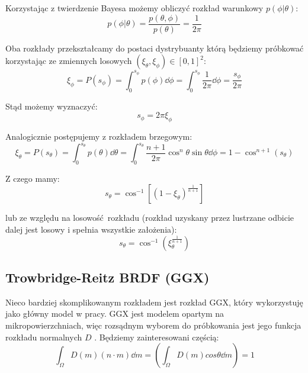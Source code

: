 \documentclass[../main.tex]{subfiles}
\begin{document}
Korzystając z twierdzenie Bayesa możemy obliczyć rozkład warunkowy $p(\phi | \theta)$:
\begin{equation}
  p(\phi | \theta) = \frac{
    p(\theta, \phi)
	}{
		p(\theta)
	} = \frac{1}{2\pi}
\end{equation}

Oba rozkłady przekształcamy do postaci dystrybuanty którą będziemy próbkować korzystając ze zmiennych losowych $(\xi_{\theta}, \xi_{\phi}) \in [0,1]^2$:
\begin{equation}
	\xi_\phi = P(s_{\phi}) =
	\int_{0}^{s_{\phi}} {
		p(\phi) \dd \phi
	} =
	\int_{0}^{s_{\phi}} {
		\frac{1}{2\pi} \dd \phi
	} =
	\frac{s_{\phi}}{2\pi}
\end{equation}

Stąd możemy wyznaczyć:
\begin{equation}
	s_{\phi} = 2 \pi \xi_{\phi}
\end{equation}

Analogicznie postępujemy z rozkładem brzegowym:
\begin{equation}
  \xi_{\theta} = P(s_{\theta}) =
	\int_{0}^{s_{\theta}} {
		p(\theta) \dd \theta
	} =
	\int_{0}^{s_{\theta}} {
		\frac{n+1}{2\pi} \cos^{n}\theta \sin\theta \dd\phi
	} =
	1 - \cos^{n+1}(s_{\theta})
\end{equation}

Z czego mamy:
\begin{equation}
	s_{\theta} =
	\cos^{-1}\left[
		(1 - \xi_{\theta})^{\frac{1}{n+1}}
	\right]
\end{equation}

lub ze względu na losowość rozkładu (rozkład uzyskany przez lustrzane odbicie dalej jest losowy i spełnia wszystkie założenia):
\begin{equation}
	s_{\theta} =
	\cos^{-1}\left(
		\xi_{\theta}^{\frac{1}{n+1}}
	\right)
\end{equation}

\subsection{Trowbridge-Reitz BRDF (GGX)}

Nieco bardziej skomplikowanym rozkładem jest rozkład GGX, który wykorzystuję jako główny model w pracy. GGX jest modelem opartym na mikropowierzchniach, więc rozsądnym wyborem do próbkowania jest jego funkcja rozkładu normalnych $D$ \cite{NotesImportanceSampling}. Będziemy zainteresowani częścią:
\begin{equation}
  \int_{\Omega} D(m) (n \cdot m) \dd m = \left(\int_{\Omega} D(m) cos\theta \dd m\right) = 1
\end{equation}
\end{document}

